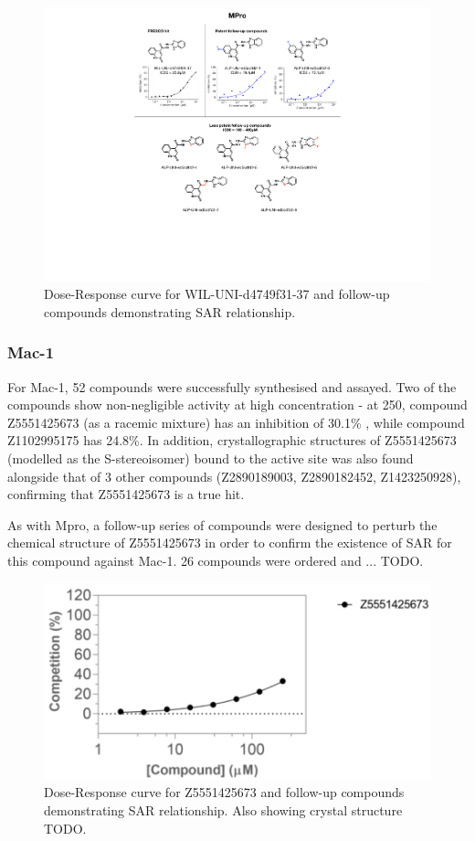 \begin{figure}
    \centering
    \includegraphics[width=\linewidth]{Chapters/Ch2/Figs/mpro_hit_IC50.pdf}
    \caption{Dose-Response curve for WIL-UNI-d4749f31-37 and follow-up compounds demonstrating SAR relationship.}
    \label{fig:mpro_hit}
\end{figure}

\subsubsection{Mac-1}
For Mac-1, 52 compounds were successfully synthesised and assayed. Two of the compounds show non-negligible activity at high concentration - at 250\uM, compound Z5551425673 (as a racemic mixture) has an inhibition of 30.1\% , while compound Z1102995175 has 24.8\%. In addition, crystallographic structures of Z5551425673 (modelled as the S-stereoisomer) bound to the active site was also found alongside that of 3 other compounds (Z2890189003, Z2890182452, Z1423250928), confirming that Z5551425673 is a true hit.

As with Mpro, a follow-up series of compounds were designed to perturb the chemical structure of Z5551425673 in order to confirm the existence of SAR for this compound against Mac-1. 26 compounds were ordered and ... TODO.

\begin{figure}
    \centering
    \includegraphics[width=\linewidth]{Chapters/Ch2/Figs/mac1_hit_IC50.png}
    \caption{Dose-Response curve for Z5551425673 and follow-up compounds demonstrating SAR relationship. Also showing crystal structure TODO.}
    \label{fig:mac1_hit}
\end{figure}

